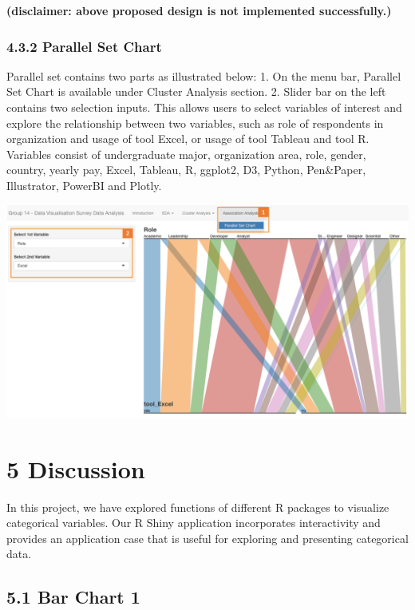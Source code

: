 \documentclass{acm_proc_article-sp}
\begin{document}
\textbf{(disclaimer: above proposed design is not implemented
successfully.)}

\hypertarget{parallel-set-chart}{%
\subsubsection{4.3.2 Parallel Set Chart}\label{parallel-set-chart}}

Parallel set contains two parts as illustrated below: 1. On the menu
bar, Parallel Set Chart is available under Cluster Analysis section. 2.
Slider bar on the left contains two selection inputs. This allows users
to select variables of interest and explore the relationship between two
variables, such as role of respondents in organization and usage of tool
Excel, or usage of tool Tableau and tool R. Variables consist of
undergraduate major, organization area, role, gender, country, yearly
pay, Excel, Tableau, R, ggplot2, D3, Python, Pen\&Paper, Illustrator,
PowerBI and Plotly.

\begin{center}\includegraphics[width=1\linewidth]{5} \end{center}

\hypertarget{discussion}{%
\section{5 Discussion}\label{discussion}}

In this project, we have explored functions of different R packages to
visualize categorical variables. Our R Shiny application incorporates
interactivity and provides an application case that is useful for
exploring and presenting categorical data.

\hypertarget{bar-chart-1}{%
\subsection{5.1 Bar Chart 1}\label{bar-chart-1}}
\end{document}
